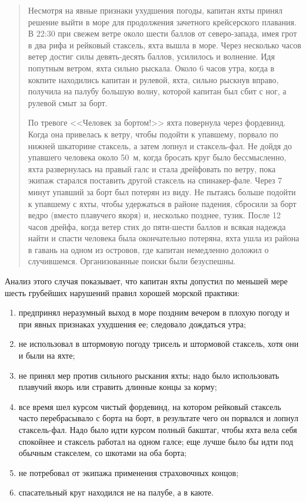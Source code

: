 \documentclass[a4paper, 12pt, twoside, final]{scrbook}
\begin{document}
\begin{quote}
Несмотря на явные признаки ухудшения погоды, капитан яхты принял решение выйти в море для продолжения зачетного крейсерского плавания. В 22:30 при свежем ветре около шести баллов от северо-запада, имея грот в два рифа и рейковый стаксель, яхта вышла в море. Через несколько часов ветер достиг силы девять-десять баллов, усилилось и волнение. Идя попутным ветром, яхта сильно рыскала. Около 6 часов утра, когда в кокпите находились капитан и рулевой, яхта, сильно рыскнув вправо, получила на палубу большую волну, которой капитан был сбит с ног, а рулевой смыт за борт.

По тревоге <<Человек за бортом!>> яхта повернула через фордевинд. Когда она привелась к ветру, чтобы подойти к упавшему, порвало по нижней шкаторине стаксель, а затем лопнул и стаксель-фал. Не дойдя до упавшего человека около 50~м, когда бросать круг было бессмысленно, яхта развернулась на правый галс и стала дрейфовать по ветру, пока экипаж старался поставить другой стаксель на спинакер-фале. Через 7 минут упавший за борт был потерян из виду. Не пытаясь больше подойти к упавшему с яхты, чтобы удержаться в районе падения, сбросили за борт ведро (вместо плавучего якоря) и, несколько позднее, тузик. После 12 часов дрейфа, когда ветер стих до пяти\--шести баллов и всякая надежда найти и спасти человека была окончательно потеряна, яхта ушла из района в гавань на одном из островов, где капитан немедленно доложил о случившемся. Организованные поиски были безуспешны.
\end{quote}

Анализ этого случая показывает, что капитан яхты допустил по меньшей мере шесть грубейших нарушений правил хорошей морской практики:

\begin{enumerate}
\item предпринял неразумный выход в море поздним вечером в плохую погоду и при явных признаках ухудшения ее; следовало дождаться утра;
\item не использовал в штормовую погоду трисель и штормовой стаксель, хотя они и были на яхте;
\item не принял мер против сильного рыскания яхты; надо было использовать плавучий якорь или стравить длинные концы за корму;
\item все время шел курсом чистый фордевинд, на котором рейковый стаксель часто перебрасывало с борта на борт, в результате чего он порвался и лопнул стаксель-фал. Надо было идти курсом полный бакштаг, чтобы яхта вела себя спокойнее и стаксель работал на одном галсе; еще лучше было бы идти под обычным стакселем, со шкотами на оба борта;
\item не потребовал от экипажа применения страховочных концов;
\item спасательный круг находился не на палубе, а в каюте.
\end{enumerate}
\end{document}
